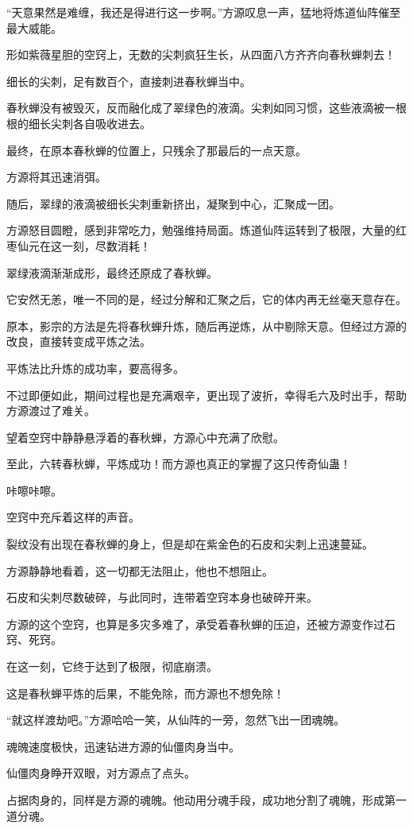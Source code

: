 \begin{this_body}
“天意果然是难缠，我还是得进行这一步啊。”方源叹息一声，猛地将炼道仙阵催至最大威能。

形如紫薇星胆的空窍上，无数的尖刺疯狂生长，从四面八方齐齐向春秋蝉刺去！

细长的尖刺，足有数百个，直接刺进春秋蝉当中。

春秋蝉没有被毁灭，反而融化成了翠绿色的液滴。尖刺如同习惯，这些液滴被一根根的细长尖刺各自吸收进去。

最终，在原本春秋蝉的位置上，只残余了那最后的一点天意。

方源将其迅速消弭。

随后，翠绿的液滴被细长尖刺重新挤出，凝聚到中心，汇聚成一团。

方源怒目圆瞪，感到非常吃力，勉强维持局面。炼道仙阵运转到了极限，大量的红枣仙元在这一刻，尽数消耗！

翠绿液滴渐渐成形，最终还原成了春秋蝉。

它安然无恙，唯一不同的是，经过分解和汇聚之后，它的体内再无丝毫天意存在。

原本，影宗的方法是先将春秋蝉升炼，随后再逆炼，从中剔除天意。但经过方源的改良，直接转变成平炼之法。

平炼法比升炼的成功率，要高得多。

不过即便如此，期间过程也是充满艰辛，更出现了波折，幸得毛六及时出手，帮助方源渡过了难关。

望着空窍中静静悬浮着的春秋蝉，方源心中充满了欣慰。

至此，六转春秋蝉，平炼成功！而方源也真正的掌握了这只传奇仙蛊！

咔嚓咔嚓。

空窍中充斥着这样的声音。

裂纹没有出现在春秋蝉的身上，但是却在紫金色的石皮和尖刺上迅速蔓延。

方源静静地看着，这一切都无法阻止，他也不想阻止。

石皮和尖刺尽数破碎，与此同时，连带着空窍本身也破碎开来。

方源的这个空窍，也算是多灾多难了，承受着春秋蝉的压迫，还被方源变作过石窍、死窍。

在这一刻，它终于达到了极限，彻底崩溃。

这是春秋蝉平炼的后果，不能免除，而方源也不想免除！

“就这样渡劫吧。”方源哈哈一笑，从仙阵的一旁，忽然飞出一团魂魄。

魂魄速度极快，迅速钻进方源的仙僵肉身当中。

仙僵肉身睁开双眼，对方源点了点头。

占据肉身的，同样是方源的魂魄。他动用分魂手段，成功地分割了魂魄，形成第一道分魂。


\end{this_body}
